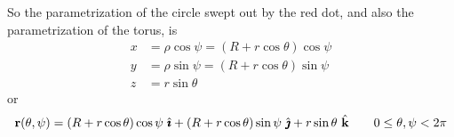 \begin{eg}[Torus]
\begin{efig}
\begin{center}
\end{center}
\end{efig}
So the parametrization of the circle swept out by the red dot, and also the
parametrization of the torus, is
\begin{align*}
x &= \rho\cos\psi =  (R + r\cos\theta)\cos\psi \\
y &= \rho\sin\psi =  (R + r\cos\theta)\sin\psi \\
z &= r\sin\theta 
\end{align*}
or
\begin{equation*}
\vr(\theta,\psi) = (R + r\cos\theta)\cos\psi \ \hi
                    + (R + r\cos\theta)\sin\psi \ \hj
                    + r\sin\theta\ \hk
\qquad 0\le\theta,\psi < 2\pi
\end{equation*}


\end{eg}


